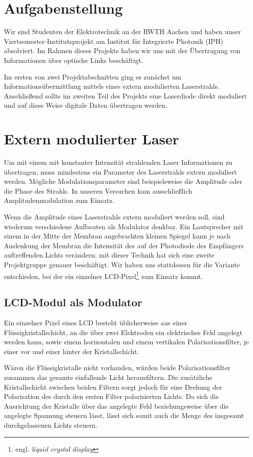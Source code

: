 \documentclass[12pt,a4paper]{article}
\begin{document}
\tableofcontents
\newpage

\section{Aufgabenstellung}
Wir sind Studenten der Elektrotechnik an der RWTH Aachen und haben unser Viertsemester-Institutsprojekt am Institut für Integrierte Photonik (IPH) absolviert. Im Rahmen dieses Projekts haben wir uns mit der Übertragung von Informationen über optische Links beschäftigt.

Im ersten von zwei Projektabschnitten ging es zunächst um Informationsübermittlung mittels eines extern modulierten Laserstrahls. Anschließend sollte im zweiten Teil des Projekts eine Laserdiode direkt moduliert und auf diese Weise digitale Daten übertragen werden.


\section{Extern modulierter Laser}
Um mit einem mit konstanter Intensität strahlenden Laser Informationen zu übertragen, muss mindestens ein Parameter des Laserstrahls extern moduliert werden. Mögliche Modulationsparameter sind beispielsweise die Amplitude oder die Phase des Strahls. In unseren Versuchen kam ausschließlich Amplitudenmodulation zum Einsatz.

Wenn die Amplitude eines Laserstrahls extern moduliert werden soll, sind wiederum verschiedene Aufbauten als Modulator denkbar. Ein Lautsprecher mit einem in der Mitte der Membran angebrachten kleinen Spiegel kann je nach Auslenkung der Membran die Intensität des auf der Photodiode des Empfängers auftreffenden Lichts verändern; mit dieser Technik hat sich eine zweite Projektgruppe genauer beschäftigt. Wir haben uns stattdessen für die Variante entschieden, bei der ein einzelner LCD-Pixel\footnote{engl. \textit{liquid crystal display}} zum Einsatz kommt.

\subsection{LCD-Modul als Modulator}
Ein einzelner Pixel eines LCD besteht üblicherweise aus einer Flüssigkristallschicht, an die über zwei Elektroden ein elektrisches Feld angelegt werden kann, sowie einem horizontalen und einem vertikalen Polarisationsfilter, je einer vor und einer hinter der Kristallschicht.

Wären die Flüssigkristalle nicht vorhanden, würden beide Polarisationsfilter zusammen das gesamte einfallende Licht herausfiltern. Die zusätzliche Kristallschicht zwischen beiden Filtern sorgt jedoch für eine Drehung der Polarisation des durch den ersten Filter polarisierten Lichts. Da sich die Ausrichtung der Kristalle über das angelegte Feld beziehungsweise über die angelegte Spannung steuern lässt, lässt sich somit auch die Menge des insgesamt durchgelassenen Lichts steuern.
\end{document}
